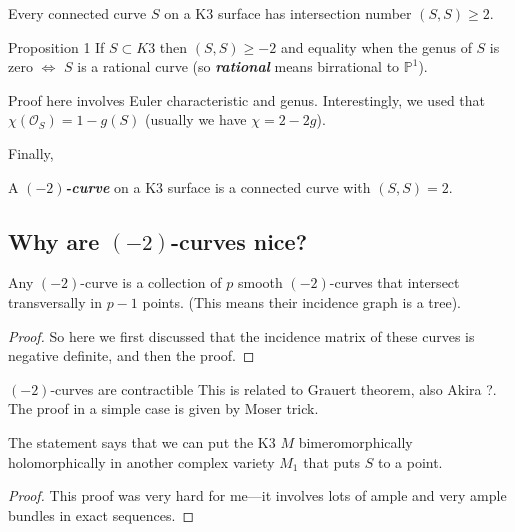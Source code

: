 \begin{thm}\leavevmode
	Every connected curve $S$ on a K3 surface has intersection number $(S,S)\geq 2$.
\end{thm}

\begin{thing4}{Proposition 1}\leavevmode
	If $S\subset K3$ then $(S,S)\geq -2$ and equality when the genus of $S$ is zero $\iff$ $S$ is a rational curve (so \textit{\textbf{rational} } means birrational to $\mathbb{P}^1$).
\end{thing4}

Proof here involves Euler characteristic and genus. Interestingly, we used that $\chi(\mathcal{O}_S)=1-g(S)$ (usually we have $\chi=2-2g$).

Finally,

\begin{defn}\leavevmode
	A \textit{\textbf{$(-2)$-curve}} on a K3 surface is a connected curve with $(S,S)=2$.
\end{defn}

\subsection{Why are $(-2)$-curves nice?}

\begin{thm}\leavevmode
	Any $(-2)$-curve is a collection of $p$ smooth $(-2)$-curves that intersect transversally in $p-1$ points. (This means their incidence graph is a tree).
\end{thm}

\begin{proof}\leavevmode
So here we first discussed that the incidence matrix of these curves is negative definite, and then the proof.
\end{proof}

\begin{thing4}{$(-2)$-curves are contractible}\leavevmode
This is related to Grauert theorem, also Akira ?. The proof in a simple case is given by Moser trick.	
\end{thing4}

The statement says that we can put the K3 $M$ bimeromorphically holomorphically in another complex variety  $M_1$ that puts $S$ to a point.

\begin{proof}\leavevmode
This proof was very hard for me---it involves lots of ample and very ample bundles in exact sequences.
\end{proof}


